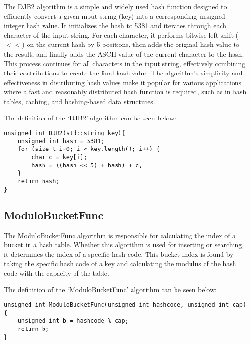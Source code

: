 The DJB2 algorithm is a simple and widely used hash function designed to efficiently convert a given input string (key) into a corresponding unsigned integer hash value. It initializes the hash to 5381 and 
iterates through each character of the input string. For each character, it performs bitwise left shift ($<<$) on the current hash by 5 positions, then adds the original hash value to the result, and finally 
adds the ASCII value of the current character to the hash. This process continues for all characters in the input string, effectively combining their contributions to create the final hash value. The algorithm's 
simplicity and effectiveness in distributing hash values make it popular for various applications where a fast and reasonably distributed hash function is required, such as in hash tables, caching, and 
hashing-based data structures.

\begin{highlight}

The definition of the `DJB2' algorithm can be seen below:

\horizontalline

\begin{verbatim}
unsigned int DJB2(std::string key){
    unsigned int hash = 5381;
    for (size_t i=0; i < key.length(); i++) {
        char c = key[i]; 
        hash = ((hash << 5) + hash) + c;
    }
    return hash;
}
\end{verbatim}

\end{highlight}

\subsection*{ModuloBucketFunc}

The ModuloBucketFunc algorithm is responsible for calculating the index of a bucket in a hash table. Whether this algorithm is used for inserting or searching, it determines the index of a specific hash code. 
This bucket index is found by taking the specific hash code of a key and calculating the modulus of the hash code with the capacity of the table.

\begin{highlight}

The definition of the `ModuloBucketFunc' algorithm can be seen below:

\horizontalline

\begin{verbatim}
unsigned int ModuloBucketFunc(unsigned int hashcode, unsigned int cap){
    unsigned int b = hashcode % cap;
    return b;
}
\end{verbatim}

\end{highlight}

